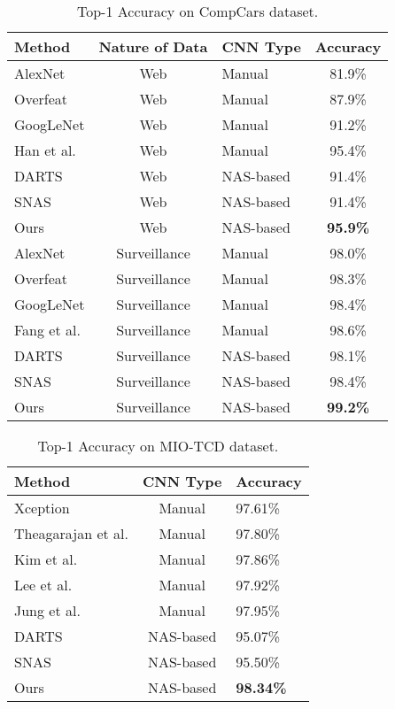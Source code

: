 \documentclass[10pt,a4paper,conference]{IEEEtran}
\begin{document}
\begin{table}
\begin{center}
\begin{tabular}{|l|c|l|c|}
\hline
Method & Nature of Data  & CNN Type & Accuracy \\
\hline\hline
AlexNet{\cite{DBLP:journals/corr/YangLLT15:3}} & Web & Manual & 81.9\% \\
Overfeat{\cite{DBLP:journals/corr/YangLLT15:3}} & Web & Manual & 87.9\% \\
GoogLeNet{\cite{DBLP:journals/corr/YangLLT15:3}} & Web & Manual & 91.2\% \\
Han et al.\cite{Han:2018:AAM:3240508.3240550:28} & Web & Manual & 95.4\% \\
DARTS \cite{liu2018darts:6} &  Web & NAS-based & 91.4\%\\
SNAS \cite{xie2018snas:4}& Web & NAS-based& 91.4\%\\
Ours & Web & NAS-based & \textbf{95.9\%} \\
\hline
AlexNet{\cite{DBLP:journals/corr/YangLLT15:3}} & Surveillance & Manual & 98.0\% \\
Overfeat{\cite{DBLP:journals/corr/YangLLT15:3}} & Surveillance & Manual & 98.3\% \\
GoogLeNet{\cite{DBLP:journals/corr/YangLLT15:3}} & Surveillance & Manual & 98.4\% \\
Fang et al.\cite{Fang2017FineGrainedVM:27} & Surveillance & Manual & 98.6\% \\
DARTS \cite{liu2018darts:6} & Surveillance & NAS-based & 98.1\%\\
SNAS \cite{xie2018snas:4}& Surveillance & NAS-based& 98.4\%\\
Ours & Surveillance & NAS-based & \textbf{99.2\%} \\ 
\hline
\end{tabular}
\end{center}
\caption{Top-1 Accuracy on CompCars dataset.}
\label{tab:1}
\end{table}
\begin{table}
\begin{center}
\begin{tabular}{|l|c|l|}
\hline
Method & CNN Type & Accuracy \\
\hline\hline
Xception\cite{chollet2017xception:44} & Manual & 97.61\% \\
Theagarajan et al.\cite{theagarajan2017eden:45} & Manual & 97.80\% \\
Kim et al.\cite{kim2017vehicle:46} & Manual & 97.86\% \\
Lee et al.\cite{taek2017deep:47}& Manual & 97.92\% \\
Jung et al.\cite{jung2017resnet:48} & Manual & 97.95\% \\
DARTS \cite{liu2018darts:6} & NAS-based & 95.07\% \\ 
SNAS \cite{xie2018snas:4} & NAS-based & 95.50\% \\
Ours & NAS-based & \textbf{98.34\%} \\
\hline
\end{tabular}
\end{center}
\caption{Top-1 Accuracy on MIO-TCD dataset.}
\label{tab:3}
\end{table}
\end{document}
